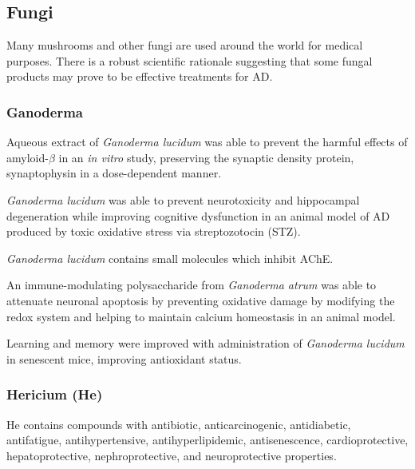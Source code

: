 










\subsection{Fungi}

Many mushrooms and other fungi are used around the world for medical purposes.
There is a robust scientific rationale suggesting that some
fungal products may prove to be effective treatments for AD.

\subsubsection{Ganoderma}

Aqueous extract of \textit{Ganoderma lucidum}
was able to prevent the harmful effects of
amyloid-$\beta$ in an \textit{in vitro} study,
preserving the synaptic density protein, synaptophysin
in a dose-dependent manner.
\cite{lai2008antagonizing}

\textit{Ganoderma lucidum} was able to prevent neurotoxicity and
hippocampal degeneration while improving cognitive dysfunction in an animal model
of AD produced by toxic oxidative stress via streptozotocin (STZ).
\cite{zhou2012neuroprotective}

\textit{Ganoderma lucidum} contains small molecules which inhibit AChE.
\cite{lee2011selective}

An immune-modulating polysaccharide from \textit{Ganoderma atrum}
was able to attenuate neuronal apoptosis
by preventing oxidative damage by modifying the
redox system and helping to maintain calcium homeostasis
in an animal model.
\cite{li2011ganoderma}

Learning and memory were improved with
administration of \textit{Ganoderma lucidum}
in senescent mice,
improving antioxidant status.
\cite{wang2004effects}


\subsubsection{Hericium (He)}

He contains compounds with
antibiotic, anticarcinogenic, antidiabetic, antifatigue,
antihypertensive, antihyperlipidemic, antisenescence,
cardioprotective, hepatoprotective, nephroprotective,
and neuroprotective properties.
\cite{friedman2015chemistry}

